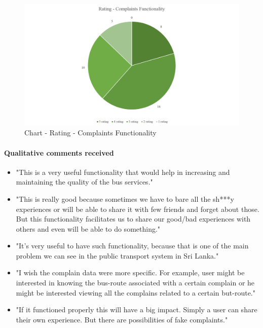 \begin {figure} [H]
\centering
\includegraphics [scale=0.6] {ratingComplaintsFunctionality}
\caption [Chart - Rating - Complaints Functionality] {Chart - Rating - Complaints Functionality}
\label {image-ratingComplaintsFunctionality}
\end {figure}

\paragraph{Qualitative comments received}
\begin {itemize}
\item "This is a very useful functionality that would help in increasing and maintaining the quality of the bus services."
\item "This is really good because sometimes we have to bare all the sh***y experiences or will be able to share it with few friends and forget about those. But this functionality facilitates us to share our good/bad experiences with others and even will be able to do something."
\item "It's very useful to have such functionality, because that is one of  the main problem we can see in the public transport system in Sri Lanka."
\item "I wish the complain data were more specific. For example, user might be interested in knowing the bus-route associated with a certain complain or he might be interested viewing all the complains related to a certain but-route."
\item "If it functioned properly this will have a big impact. Simply a user can share their own experience. But there are possibilities of fake complaints."
\end {itemize}



